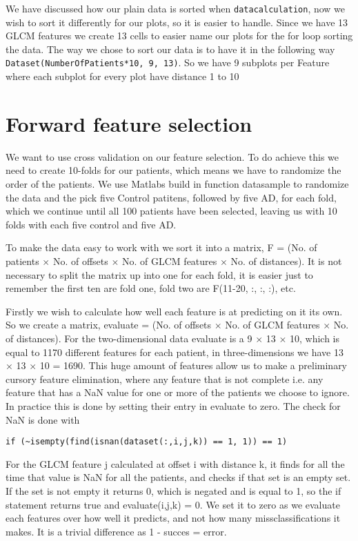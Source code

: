 We have discussed how our plain data is sorted when \texttt{datacalculation}, now we wish to sort it differently for our plots, so it is easier to handle. Since we have 13 GLCM features  we create 13 cells to easier name our plots for the for loop sorting the data. The way we chose to sort our data is to have it in the following way \texttt{Dataset(NumberOfPatients*10, 9, 13)}. So we have 9 subplots per Feature where each subplot for every plot have distance 1 to 10 


\section{Forward feature selection}

We want to use cross validation on our feature selection. To do achieve this we need to create 10-folds for our patients, which means we have to randomize the order of the patients. We use Matlabs build in function datasample to randomize the data and the pick five Control patitens, followed by five AD, for each fold, which we continue until all 100 patients have been selected, leaving us with 10 folds with each five control and five AD.

To make the data easy to work with we sort it into a matrix, F = (No. of patients $\times$ No. of offsets $\times$ No. of GLCM features $\times$ No. of distances). It is not necessary to split the matrix up into one for each fold, it is easier just to remember the first ten are fold one, fold two are F(11-20, :, :, :), etc.

Firstly we wish to calculate how well each feature is at predicting on it its own. So we create a matrix, evaluate = (No. of offsets $\times$ No. of GLCM features $\times$ No. of distances). For the two-dimensional data evaluate is a 9 $\times$ 13  $\times$ 10, which is equal to 1170 different features for each patient, in three-dimensions we have 13 $\times$  13  $\times$  10 = 1690. This huge amount of features allow us to make a preliminary cursory feature elimination, where any feature that is not complete i.e. any feature that has a NaN value for one or more of the patients we choose to ignore. In practice this is done by setting their entry in evaluate to zero. The check for NaN is done with
\begin{lstlisting}[mathescape=true]
	if (~isempty(find(isnan(dataset(:,i,j,k)) == 1, 1)) == 1)
\end{lstlisting}
For the GLCM feature j calculated at offset i with distance k, it finds for all the time that value is NaN for all the patients, and checks if that set is an empty set. If the set is not empty it returns 0, which is negated and is equal to 1, so the if statement returns true and evaluate(i,j,k) = 0. We set it to zero as we evaluate each features over how well it predicts, and not how many missclassifications it makes. It is a trivial difference as 1 - succes = error.


